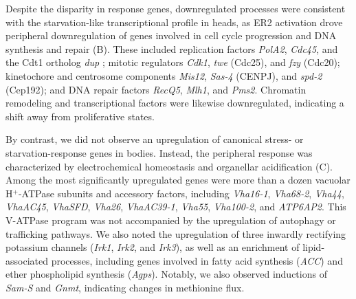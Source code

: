 Despite the disparity in response genes, downregulated processes were consistent with the starvation-like transcriptional profile in heads, as ER2 activation drove peripheral downregulation of genes involved in cell cycle progression and DNA synthesis and repair (B). 
These included replication factors \textit{PolA2}, \textit{Cdc45}, and the Cdt1 ortholog \textit{dup} \citep{whittaker2000}; mitotic regulators \textit{Cdk1}, \textit{twe} (Cdc25), and \textit{fzy} (Cdc20); kinetochore and centrosome components \textit{Mis12}, \textit{Sas-4} (CENPJ), and \textit{spd-2} (Cep192); and DNA repair factors \textit{RecQ5}, \textit{Mlh1}, and \textit{Pms2}. Chromatin remodeling and transcriptional factors were likewise downregulated, indicating a shift away from proliferative states. 

By contrast, we did not observe an upregulation of canonical stress- or starvation-response genes in bodies. 
Instead, the peripheral response was characterized by electrochemical homeostasis and organellar acidification (C). 
Among the most significantly upregulated genes were more than a dozen vacuolar H$^{+}$-ATPase subunits and accessory factors, including \textit{Vha16-1}, \textit{Vha68-2}, \textit{Vha44}, \textit{VhaAC45}, \textit{VhaSFD}, \textit{Vha26}, \textit{VhaAC39-1}, \textit{Vha55}, \textit{Vha100-2}, and \textit{ATP6AP2}. 
This V-ATPase program was not accompanied by the upregulation of autophagy or trafficking pathways. 
We also noted the upregulation of three inwardly rectifying potassium channels (\textit{Irk1}, \textit{Irk2}, and \textit{Irk3}), as well as an enrichment of lipid-associated processes, including genes involved in fatty acid synthesis (\textit{ACC}) and ether phospholipid synthesis (\textit{Agps}). 
Notably, we also observed inductions of \textit{Sam-S} and \textit{Gnmt}, indicating changes in methionine flux.

